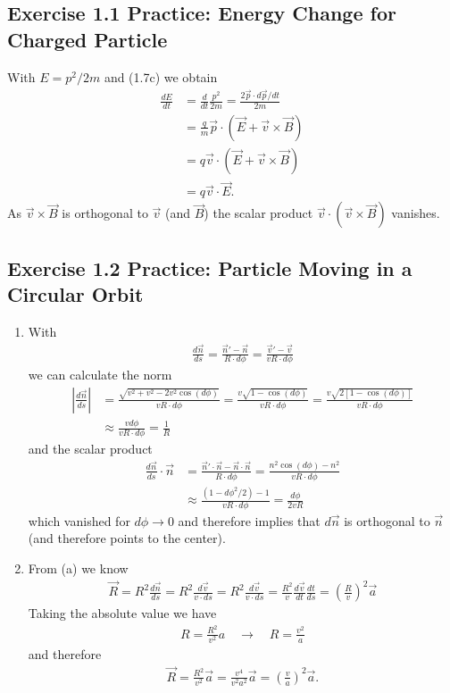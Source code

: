 \documentclass[../main.tex]{subfiles}
\begin{document}
\subsection{Exercise 1.1 Practice: Energy Change for Charged Particle}
With $E=p^2/2m$ and (1.7c) we obtain
\begin{align}
    \frac{dE}{dt}&=\frac{d}{dt}\frac{p^2}{2m}=\frac{2 \vec{p}\cdot d\vec{p}/dt}{2m}\\
    &=\frac{q}{m}\vec{p}\cdot (\vec{E}+\vec{v}\times\vec{B})\\
    &=q\vec{v}\cdot (\vec{E}+\vec{v}\times\vec{B})\\
    &=q\vec{v}\cdot\vec{E}.
\end{align}
As $\vec{v}\times\vec{B}$ is orthogonal to $\vec{v}$ (and $\vec{B}$) the scalar product $\vec{v}\cdot(\vec{v}\times\vec{B})$ vanishes.

\subsection{Exercise 1.2 Practice: Particle Moving in a Circular Orbit}
\begin{enumerate}[label=(\alph*)]
\item With
\begin{align}
    \frac{d\vec{n}}{ds}
    =\frac{\vec{n}'-\vec{n}}{R\cdot d\phi}=\frac{\vec{v}'-\vec{v}}{vR\cdot d\phi}
\end{align}
we can calculate the norm
\begin{align}
    \left|\frac{d\vec{n}}{ds}\right|
    &=\frac{\sqrt{v^2+v^2-2v^2\cos(d\phi)}}{vR\cdot d\phi}
    =\frac{v\sqrt{1-\cos(d\phi)}}{vR\cdot d\phi}
    = \frac{v\sqrt{2[1-\cos(d\phi)]}}{vR\cdot d\phi}\\
    &\approx\frac{vd\phi}{vR\cdot d\phi}=\frac{1}{R}
\end{align}
and the scalar product
\begin{align}
    \frac{d\vec{n}}{ds}\cdot\vec{n}
    &=\frac{\vec{n}'\cdot\vec{n}-\vec{n}\cdot\vec{n}}{R\cdot d\phi}=\frac{n^2\cos(d\phi)-n^2}{vR\cdot d\phi}\\
    &\approx \frac{(1-d\phi^2/2)-1}{vR\cdot d\phi}=\frac{d\phi}{2vR}
\end{align}
which vanished for $d\phi\rightarrow0$ and therefore implies that $d\vec{n}$ is orthogonal to $\vec{n}$ (and therefore points to the center).
\item From (a) we know
\begin{align}
    \vec{R}=R^2\frac{d\vec{n}}{ds}
    =R^2\frac{d\vec{v}}{v\cdot ds}
    =R^2\frac{d\vec{v}}{v\cdot ds}
    =\frac{R^2}{v}\frac{d\vec{v}}{dt}\frac{dt}{ds}
    =\left(\frac{R}{v}\right)^2\vec{a}
\end{align}
Taking the absolute value we have
\begin{align}
    R=\frac{R^2}{v^2}a\quad\rightarrow\quad R=\frac{v^2}{a}
\end{align}
and therefore
\begin{align}
    \vec{R}=\frac{R^2}{v^2}\vec{a}=\frac{v^4}{v^2 a^2}\vec{a}=\left(\frac{v}{a}\right)^2\vec{a}.
\end{align}
\end{enumerate}
\end{document}

